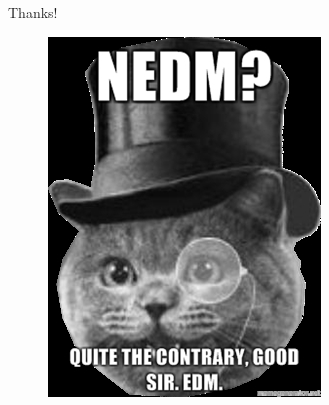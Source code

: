 \documentclass{beamer}
\begin{document}
\begin{frame}{Thanks!}


\begin{figure}[htb]
\centerline{
\includegraphics[10cm, 10cm]{edmgoodsir.jpg}
}
\end{figure}



\end{frame}
\end{document}
